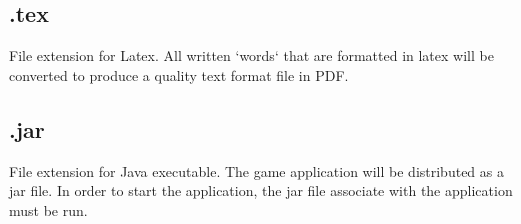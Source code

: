 \documentclass[12pt]{article}
\begin{document}
\subsection{.tex}
File extension for Latex. All written `words` that are formatted in latex will be converted to produce a quality text format file in PDF.
\subsection{.jar}
File extension for Java executable. The game application will be distributed as a jar file. In order to start the application, the jar file associate with the application must be run.
\end{document}

